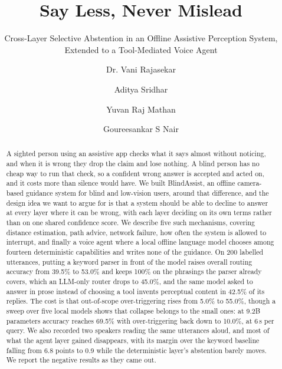 \documentclass[sigconf,nonacm]{acmart}
\begin{document}
\title{Say Less, Never Mislead}
\subtitle{Cross-Layer Selective Abstention in an Offline Assistive Perception
System, Extended to a Tool-Mediated Voice Agent}

\author{Dr. Vani Rajasekar}

\author{Aditya Sridhar}

\author{Yuvan Raj Mathan}

\author{Goureesankar S Nair}

\begin{abstract}
A sighted person using an assistive app checks what it says almost without
noticing, and when it is wrong they drop the claim and lose nothing. A blind
person has no cheap way to run that check, so a confident wrong answer is
accepted and acted on, and it costs more than silence would have. We built
BlindAssist, an offline camera-based guidance system for blind and low-vision
users, around that difference, and the design idea we want to argue for is that
a system should be able to decline to answer at every layer where it can be
wrong, with each layer deciding on its own terms rather than on one shared
confidence score. We describe five such mechanisms, covering distance
estimation, path advice, network failure, how often the system is allowed to
interrupt, and finally a voice agent where a local offline language model
chooses among fourteen deterministic capabilities and writes none of the
guidance. On 200 labelled utterances, putting a keyword parser in front of the
model raises overall routing accuracy from 39.5\% to 53.0\% and keeps 100\% on
the phrasings the parser already covers, which an LLM-only router drops to
45.0\%, and the same model asked to answer in prose instead of choosing a tool
invents perceptual content in 42.5\% of its replies. The cost is that
out-of-scope over-triggering rises from 5.0\% to 55.0\%, though a sweep over
five local models shows that collapse belongs to the small ones: at 9.2B
parameters accuracy reaches 69.5\% with over-triggering back down to 10.0\%, at
6\,s per query. We also recorded two speakers reading the same utterances aloud,
and most of what the agent layer gained disappears, with its margin over the
keyword baseline falling from 6.8 points to 0.9 while the deterministic layer's
abstention barely moves. We report the negative results as they came out.
\end{abstract}
\end{document}
